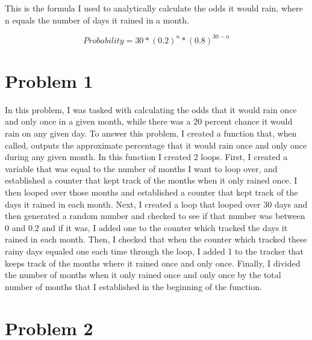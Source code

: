 \documentclass[onecolumn]{revtex4}
\begin{document}
	This is the formula I used to analytically calculate the odds it would rain, where n equals the number of days it rained in a month.

	$$ Probability = 30 * (0.2)^n * (0.8)^{30 - n}$$

\section{Problem 1}

	In this problem, I was tasked with calculating the odds that it would rain once and only once in a given month, while there was a 20 percent chance it would rain on any given day. To answer this problem, I created a function that, when called, outputs the approximate percentage that it would rain once and only once during any given month. In this function I created 2 loops. First, I created a variable that was equal to the number of months I want to loop over, and established a counter that kept track of the months when it only rained once. I then looped over those months and established a counter that kept track of the days it rained in each month. Next, I created a loop that looped over 30 days and then generated a random number and checked to see if that number was between 0 and 0.2 and if it was, I added one to the counter which tracked the days it rained in each month. Then, I checked that when the counter which tracked these rainy days equaled one each time through the loop, I added 1 to the tracker that keeps track of the months where it rained once and only once. Finally, I divided the number of months when it only rained once and only once by the total number of months that I established in the beginning of the function.


\section{Problem 2}
\end{document}

